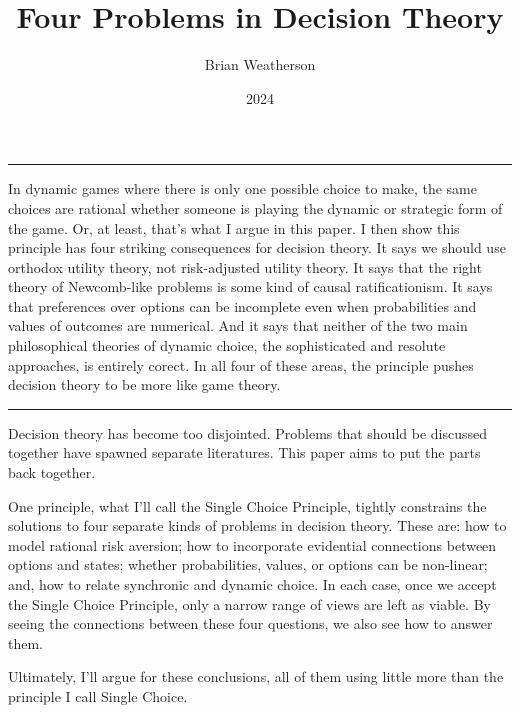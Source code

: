 \documentclass[
  10pt,
  letterpaper,
  DIV=11,
  numbers=noendperiod,
  twoside]{scrartcl}
\title{Four Problems in Decision Theory}
\author{Brian Weatherson}
\date{2024}
\renewenvironment{abstract}
 {\vspace{-1.25cm}
 \quotation\small\noindent\rule{\linewidth}{.5pt}\par\smallskip
 \noindent }
 {\par\noindent\rule{\linewidth}{.5pt}\endquotation}
\begin{document}
\maketitle
\begin{abstract}
In dynamic games where there is only one possible choice to make, the
same choices are rational whether someone is playing the dynamic or
strategic form of the game. Or, at least, that's what I argue in this
paper. I then show this principle has four striking consequences for
decision theory. It says we should use orthodox utility theory, not
risk-adjusted utility theory. It says that the right theory of
Newcomb-like problems is some kind of causal ratificationism. It says
that preferences over options can be incomplete even when probabilities
and values of outcomes are numerical. And it says that neither of the
two main philosophical theories of dynamic choice, the sophisticated and
resolute approaches, is entirely corect. In all four of these areas, the
principle pushes decision theory to be more like game theory.
\end{abstract}

Decision theory has become too disjointed. Problems that should be
discussed together have spawned separate literatures. This paper aims to
put the parts back together.

One principle, what I'll call the Single Choice Principle, tightly
constrains the solutions to four separate kinds of problems in decision
theory. These are: how to model rational risk aversion; how to
incorporate evidential connections between options and states; whether
probabilities, values, or options can be non-linear; and, how to relate
synchronic and dynamic choice. In each case, once we accept the Single
Choice Principle, only a narrow range of views are left as viable. By
seeing the connections between these four questions, we also see how to
answer them.

Ultimately, I'll argue for these conclusions, all of them using little
more than the principle I call Single Choice.
\end{document}
